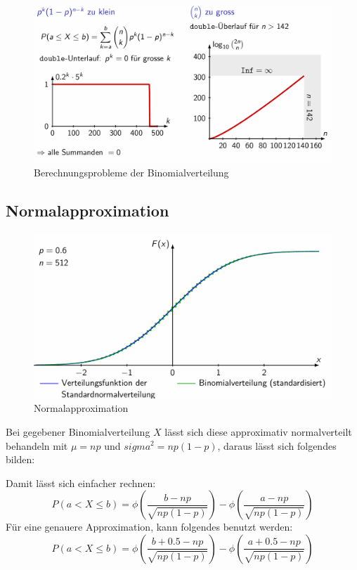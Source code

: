 \documentclass[../Main.tex]{subfiles}
\begin{document}
\begin{figure}[H]
    \centering
    \includegraphics[width=0.75\linewidth]{Images/binom-berechnungsprobleme.png}
    \caption{Berechnungsprobleme der Binomialverteilung}
\end{figure}

\subsection{Normalapproximation}

\begin{figure}[H]
    \centering
    \includegraphics[width=0.75\linewidth]{Images/normalapproximation.png}
    \caption{Normalapproximation}
\end{figure}

Bei gegebener Binomialverteilung \(X\) lässt sich diese approximativ normalverteilt behandeln mit
\(\mu = np\) und \(sigma^2 = np (1-p)\), daraus lässt sich folgendes bilden:

Damit lässt sich einfacher rechnen:
\begin{equation}
    P(a < X \leq b) = \phi(\frac{b-np}{\sqrt{np(1-p)}}) - \phi(\frac{a-np}{\sqrt{np(1-p)}})
\end{equation}
Für eine genauere Approximation, kann folgendes benutzt werden:
\begin{equation}
    P(a < X \leq b) = \phi(\frac{b+0.5-np}{\sqrt{np(1-p)}}) - \phi(\frac{a+0.5-np}{\sqrt{np(1-p)}})
\end{equation}
\end{document}
